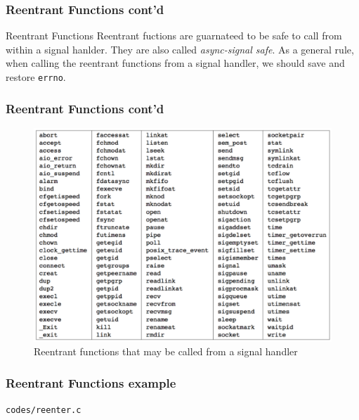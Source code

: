 \documentclass[newPxFont,sthlmFooter,nooffset]{beamer}
\begin{document}
\begin{frame}[fragile]
  \frametitle{Reentrant Functions cont'd}
\begin{block}{Reentrant Functions}
Reentrant fuctions are guarnateed to be safe to call from within a signal hanlder.   They are also called \textit{async-signal safe}. As a general rule, when calling the reentrant  functions from a signal handler, we should save and restore \texttt{errno}.
\end{block}
\end{frame}

\begin{frame}
  \frametitle{Reentrant Functions cont'd}  
  \begin{figure}[h]
    \centering
    \includegraphics[height=0.87\textheight]{figure/fig10-4_reentrant.png}
    \caption{Reentrant functions that may be called from a signal handler}
  \end{figure}
\end{frame}


\begin{frame}
  \frametitle{Reentrant Functions example}
\texttt{codes/reenter.c}

\end{frame}

\end{document}
